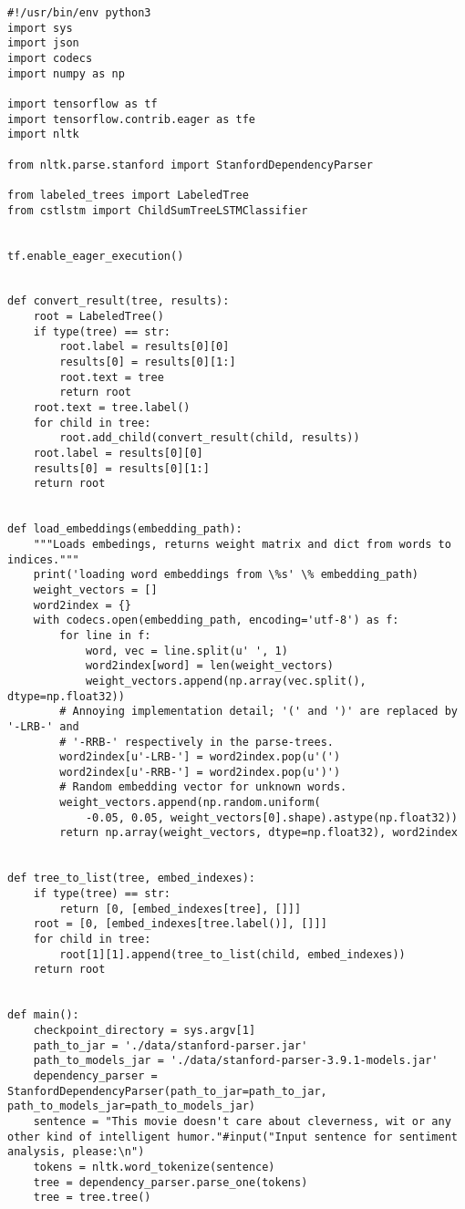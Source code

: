 \begin{lstlisting}[style=app]
#!/usr/bin/env python3
import sys
import json
import codecs
import numpy as np

import tensorflow as tf
import tensorflow.contrib.eager as tfe
import nltk

from nltk.parse.stanford import StanfordDependencyParser

from labeled_trees import LabeledTree
from cstlstm import ChildSumTreeLSTMClassifier


tf.enable_eager_execution()


def convert_result(tree, results):
    root = LabeledTree()
    if type(tree) == str:
        root.label = results[0][0]
        results[0] = results[0][1:]
        root.text = tree
        return root
    root.text = tree.label()
    for child in tree:
        root.add_child(convert_result(child, results))
    root.label = results[0][0]
    results[0] = results[0][1:]
    return root


def load_embeddings(embedding_path):
    """Loads embedings, returns weight matrix and dict from words to indices."""
    print('loading word embeddings from \%s' \% embedding_path)
    weight_vectors = []
    word2index = {}
    with codecs.open(embedding_path, encoding='utf-8') as f:
        for line in f:
            word, vec = line.split(u' ', 1)
            word2index[word] = len(weight_vectors)
            weight_vectors.append(np.array(vec.split(), dtype=np.float32))
        # Annoying implementation detail; '(' and ')' are replaced by '-LRB-' and
        # '-RRB-' respectively in the parse-trees.
        word2index[u'-LRB-'] = word2index.pop(u'(')
        word2index[u'-RRB-'] = word2index.pop(u')')
        # Random embedding vector for unknown words.
        weight_vectors.append(np.random.uniform(
            -0.05, 0.05, weight_vectors[0].shape).astype(np.float32))
        return np.array(weight_vectors, dtype=np.float32), word2index


def tree_to_list(tree, embed_indexes):
    if type(tree) == str:
        return [0, [embed_indexes[tree], []]]
    root = [0, [embed_indexes[tree.label()], []]]
    for child in tree:
        root[1][1].append(tree_to_list(child, embed_indexes))
    return root


def main():
    checkpoint_directory = sys.argv[1]
    path_to_jar = './data/stanford-parser.jar'
    path_to_models_jar = './data/stanford-parser-3.9.1-models.jar'
    dependency_parser = StanfordDependencyParser(path_to_jar=path_to_jar, path_to_models_jar=path_to_models_jar)
    sentence = "This movie doesn't care about cleverness, wit or any other kind of intelligent humor."#input("Input sentence for sentiment analysis, please:\n")
    tokens = nltk.word_tokenize(sentence)
    tree = dependency_parser.parse_one(tokens)
    tree = tree.tree()


\end{lstlisting}
